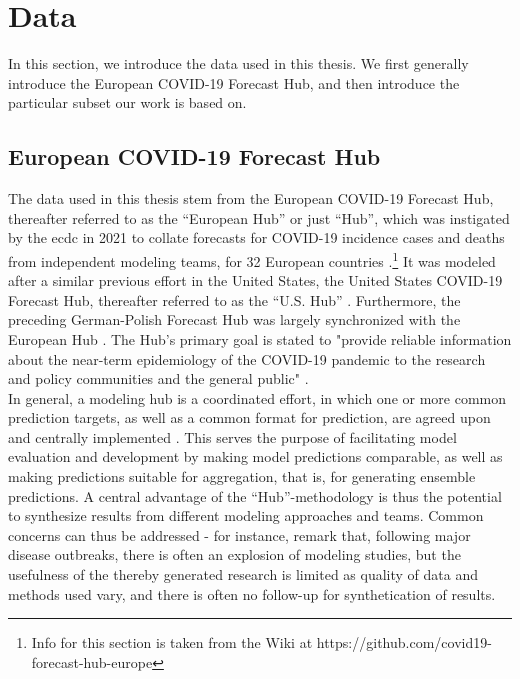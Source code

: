 \section{Data}
In this section, we introduce the data used in this thesis. We first generally introduce the European COVID-19 Forecast Hub, and then introduce the particular subset our work is based on.
\subsection{European COVID-19 Forecast Hub}
The data used in this thesis stem from the European COVID-19 Forecast Hub, thereafter referred to as the ``European Hub'' or just ``Hub'', which was instigated by the \ac{ecdc} in 2021 to collate forecasts for COVID-19 incidence cases and deaths from independent modeling teams, for 32 European countries \citep{sherratt_european_2022}.\footnote{Info for this section is taken from the Wiki at https://github.com/covid19-forecast-hub-europe} It was modeled after a similar previous effort in the United States, the United States COVID-19 Forecast Hub, thereafter referred to as the ``U.S. Hub'' \citep{cramer_united_2021}. Furthermore, the preceding German-Polish Forecast Hub was largely synchronized with the European Hub \citep{bracher_german_2020}. The Hub's primary goal is stated to "provide reliable information about the near-term epidemiology of the COVID-19 pandemic to the research and policy communities and the general public" \citep{sherratt_predictive_2022}.\\ 
In general, a modeling hub is a coordinated effort, in which one or more common prediction targets, as well as a common format for prediction, are agreed upon and centrally implemented \citep{reich_collaborative_2022}. This serves the purpose of facilitating model evaluation and development by making model predictions comparable, as well as making predictions suitable for aggregation, that is, for generating ensemble predictions. A central advantage of the ``Hub''-methodology is thus the potential to synthesize results from different modeling approaches and teams. Common concerns can thus be addressed - for instance, \cite{metcalf_opportunities_2017} remark that, following major disease outbreaks, there is often an explosion of modeling studies, but the usefulness of the thereby generated research is limited as quality of data and methods used vary, and there is often no follow-up for synthetication of results. %
